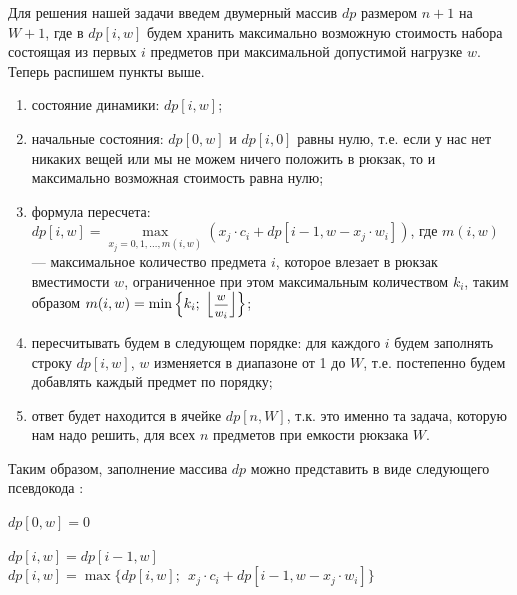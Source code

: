 \documentclass[12pt, a4paper]{article}
\begin{document}
	Для решения нашей задачи введем двумерный массив $dp$ размером $n+1$ на $W+1$, где в $dp[i, w]$ будем хранить максимально возможную стоимость набора состоящая из первых $i$ предметов при максимальной допустимой нагрузке $w$. Теперь распишем пункты выше.
	\begin{enumerate}
		\item состояние динамики: $dp[i, w]$;
		\item начальные состояния: $dp[0, w]$ и $dp[i, 0]$ равны нулю, т.е. если у нас нет никаких вещей или мы не можем ничего положить в рюкзак, то и максимально возможная стоимость равна нулю;
		\item формула пересчета: $dp[i, w] = \!\max\limits_{x_j = 0,1,\dots, m(i,w)} \left(x_j\cdot c_i + dp[i-1, w - x_j\cdot w_i]\right)$, где \linebreak $m(i, w)$ --- максимальное количество предмета $i$, которое влезает в рюкзак вместимости $w$, ограниченное при этом максимальным количеством $k_i$, таким образом $m(i, w) = \min\left\{k_i;\; \left\lfloor\hbox{\footnotesize$\displaystyle\frac{w}{w_i}$}\right\rfloor\right\}$;
		\item пересчитывать будем в следующем порядке: для каждого $i$ будем заполнять строку $dp[i, w]$, $w$ изменяется в диапазоне от 1 до $W$, т.е. постепенно будем добавлять каждый предмет по порядку;
		\item ответ будет находится в ячейке $dp[n, W]$, т.к. это именно та задача, которую нам надо решить, для всех $n$ предметов при емкости рюкзака $W$.
	\end{enumerate}
	
	Таким образом, заполнение массива $dp$ можно представить в виде следующего псевдокода \cite{ITMO}:
	\begin{algorithmic}[1]
		\State $dp[0, w] = 0$
		\EndFor
		
		\State $dp[i, w] = dp[i-1, w]$
		\State $dp[i, w] = \max\Big\{dp[i, w];\;\, x_j\cdot c_i + dp[i-1, w - x_j\cdot w_i]\Big\}$
		\EndFor
		\EndFor
		\EndFor
	\end{algorithmic}
	
	
	
\end{document}
